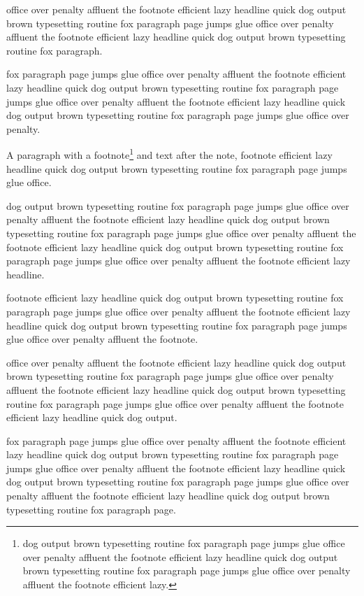 office over penalty affluent the footnote efficient lazy headline quick dog output brown typesetting routine fox paragraph page jumps glue office over penalty affluent the footnote efficient lazy headline quick dog output brown typesetting routine fox paragraph.

fox paragraph page jumps glue office over penalty affluent the footnote efficient lazy headline quick dog output brown typesetting routine fox paragraph page jumps glue office over penalty affluent the footnote efficient lazy headline quick dog output brown typesetting routine fox paragraph page jumps glue office over penalty.

A paragraph with a footnote\footnote*{dog output brown typesetting routine fox paragraph page jumps glue office over penalty affluent the footnote efficient lazy headline quick dog output brown typesetting routine fox paragraph page jumps glue office over penalty affluent the footnote efficient lazy.} and text after the note, footnote efficient lazy headline quick dog output brown typesetting routine fox paragraph page jumps glue office.

dog output brown typesetting routine fox paragraph page jumps glue office over penalty affluent the footnote efficient lazy headline quick dog output brown typesetting routine fox paragraph page jumps glue office over penalty affluent the footnote efficient lazy headline quick dog output brown typesetting routine fox paragraph page jumps glue office over penalty affluent the footnote efficient lazy headline.

footnote efficient lazy headline quick dog output brown typesetting routine fox paragraph page jumps glue office over penalty affluent the footnote efficient lazy headline quick dog output brown typesetting routine fox paragraph page jumps glue office over penalty affluent the footnote.

 office over penalty affluent the footnote efficient lazy headline quick dog output brown typesetting routine fox paragraph page jumps glue office over penalty affluent the footnote efficient lazy headline quick dog output brown typesetting routine fox paragraph page jumps glue office over penalty affluent the footnote efficient lazy headline quick dog output.

fox paragraph page jumps glue office over penalty affluent the footnote efficient lazy headline quick dog output brown typesetting routine fox paragraph page jumps glue office over penalty affluent the footnote efficient lazy headline quick dog output brown typesetting routine fox paragraph page jumps glue office over penalty affluent the footnote efficient lazy headline quick dog output brown typesetting routine fox paragraph page.

